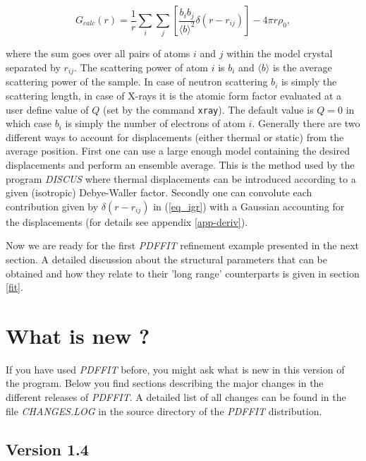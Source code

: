 \begin{equation}
  G_{calc}(r) = \frac{1}{r} \sum_{i}\sum_{j} \left [
                \frac{b_{i}b_{j}}{\langle b \rangle ^{2}}
                \delta (r - r_{ij}) \right ]   - 4 \pi r \rho_{0},
  \label{eq_igr}
\end{equation}

\noindent
where the sum goes over all pairs of atoms $i$ and $j$ within the
model crystal separated by $r_{ij}$. The scattering power of atom $i$
is $b_{i}$ and $\langle b \rangle$ is the average scattering power
of the sample. In case of neutron scattering $b_{i}$ is simply the
scattering length, in case of X-rays it is the atomic form factor
evaluated at a user define value of $Q$ (set by the command {\tt xray}).
The default value is $Q=0$ in which case $b_{i}$ is simply the number
of electrons of atom $i$. Generally there are two different
ways to account for displacements (either thermal or static)
from the average position. First one can use a large enough model
containing the desired displacements and perform an ensemble average.
This is the method used by the program {\it DISCUS} where thermal
displacements can be introduced according to a given
(isotropic) Debye-Waller factor. Secondly one can convolute each
contribution given by $\delta (r - r_{ij})$ in (\ref{eq_igr}) with a
Gaussian accounting for the displacements (for details see appendix
\ref{app-deriv}). \par

Now we are ready for the first {\it PDFFIT} refinement example
presented in the next section. A detailed discussion about the
structural parameters that can be obtained and how they relate to
their 'long range' counterparts is given in section \ref{fit}.


\section{What is new ? \label{new}}

If you have used {\it PDFFIT} before, you might ask what is new in
this version of the program. Below you find sections describing the
major changes in the different releases of {\it PDFFIT}. A detailed
list of all changes can be found in the file {\it CHANGES.LOG} in
the source directory of the {\it PDFFIT} distribution.

\subsection*{Version 1.4}

